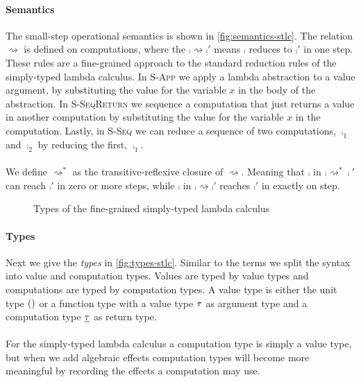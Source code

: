 {\paragraph{Semantics}
The small-step operational semantics is shown in \cref{fig:semantics-stlc}.
The relation $\rightsquigarrow$ is defined on computations, where the $\comp \rightsquigarrow \comp'$ means $\comp$ reduces to $\comp'$ in one step.
These rules are a fine-grained approach to the standard reduction rules of the simply-typed lambda calculus.
In {\footnotesize\textsc{S-App}} we apply a lambda abstraction to a value argument, by substituting the value for the variable $x$ in the body of the abstraction.
In {\footnotesize\textsc{S-SeqReturn}} we sequence a computation that just returns a value in another computation by substituting the value for the variable $x$ in the computation.
Lastly, in {\footnotesize\textsc{S-Seq}} we can reduce a sequence of two computations, $\comp_1$ and $\comp_2$ by reducing the first, $\comp_1$.
\\\\
We define $\rightsquigarrow^*$ as the transitive-reflexive closure of $\rightsquigarrow$.
Meaning that $\comp$ in $\comp \rightsquigarrow^* \comp'$ can reach $\comp'$ in zero or more steps, while $\comp$ in $\comp \rightsquigarrow \comp'$ reaches $\comp'$ in exactly on step.


\begin{figure}
\caption{Types of the fine-grained simply-typed lambda calculus}
\centering
\fbox{
\begin{minipage}{4 cm}
\begin{align*}
& \ty \Coloneqq \tunit \;|\; \tarr{\ty}{\cty} \\
& \cty \Coloneqq \ty
\end{align*}
\label{fig:types-stlc}
\end{minipage}
}
\end{figure}

\paragraph{Types}
Next we give the \emph{types} in \cref{fig:types-stlc}.
Similar to the terms we split the syntax into value and computation types.
Values are typed by value types and computations are typed by computation types.
A value type is either the unit type $()$ or a function type with a value type $\tau$ as argument type and a computation type  $\underline{\tau}$ as return type.
\\\\
For the simply-typed lambda calculus a computation type is simply a value type, but when we add algebraic effects computation types will become more meaningful by recording the effects a computation may use.

}
